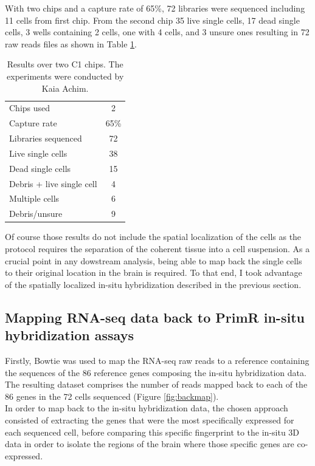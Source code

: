 	With two chips and a capture rate of 65\%, 72 libraries were sequenced including 11 cells from first chip. From the second chip 35 live single cells, 17 dead single cells, 3 wells containing 2 cells, one with 4 cells, and 3 unsure ones resulting in 72 raw reads files as shown in Table \ref{tab:rna_seq_res}.\\	
	
\begin{table}
    \myfloatalign
  \begin{tabularx}{\textwidth}{X|c} \toprule
    Chips used & 2 \\
    Capture rate  & 65\%\\
    Libraries sequenced & 72 \\
	Live single cells & 38 \\
	Dead single cells & 15 \\
	Debris + live single cell & 4 \\
	Multiple cells & 6 \\
	Debris/unsure & 9\\
  \end{tabularx}
  \caption{Results over two C1 chips. The experiments were conducted by Kaia Achim.}\label{tab:rna_seq_res}
\end{table}
  	
	Of course those results do not include the spatial localization of the cells as the protocol requires the separation of the coherent tissue into a cell suspension. As a crucial point in any dowstream analysis, being able to map back the single cells to their original location in the brain is required. To that end, I took advantage of the spatially localized in-situ hybridization described in the previous section.\\


  \subsection{Mapping RNA-seq data back to PrimR in-situ hybridization assays}
  	Firstly, Bowtie \cite{langmead12} was used to map the RNA-seq raw reads to a reference containing the sequences of the 86 reference genes composing the in-situ hybridization data. The resulting dataset comprises the number of reads mapped back to each of the 86 genes in the 72 cells sequenced (Figure \ref{fig:backmap}).\\
  	
  	 In order to map back to the in-situ hybridization data, the chosen approach consisted of extracting the genes that were the most specifically expressed for each sequenced cell, before comparing this specific fingerprint to the in-situ 3D data in order to isolate the regions of the brain where those specific genes are co-expressed.\\
  	
